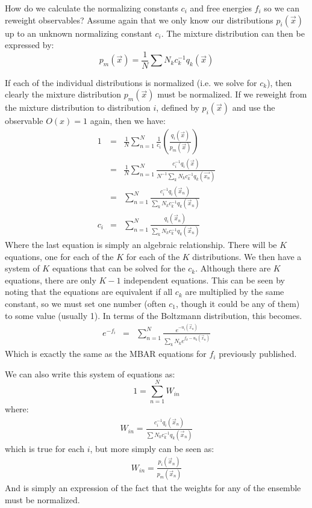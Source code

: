 \documentclass[aps,pre,twocolumn,superscriptaddress]{revtex4-1}
\begin{document}
How do we calculate the normalizing constants $c_i$ and free energies
$f_i$ so we can reweight observables? Assume again that we only know
our distributions $p_i(\vec{x})$ up to an unknown normalizing constant
$c_i$. The mixture distribution can then be expressed by:
\[ p_m(\vec{x}) = \frac{1}{N}\sum N_k c_k^{-1} q_k(\vec{x}) \]

If each of the individual distributions is normalized (i.e. we solve
for $c_k$), then clearly the mixture distribution $p_m(\vec{x})$ must
be normalized.  If we reweight from the mixture distribution to
distribution $i$, defined by $p_i(\vec{x})$ and use the observable
$O(x) = 1$ again, then we have:
\begin{eqnarray} 
  1  &=& \frac{1}{N} \sum_{n=1}^{N}\frac{1}{c_i} \left(\frac{q_i(\vec{x})}{p_m(\vec{x})}\right) \nonumber \\
     &=& \frac{1}{N} \sum_{n=1}^N\frac{c_i^{-1} q_i(\vec{x})}{N^{-1}\sum_k N_k c_k^{-1} q_k(\vec{x_n})} \nonumber \\
     &=& \sum_{n=1}^N \frac{c_i^{-1} q_i(\vec{x}_n)}{\sum_k N_k c_k^{-1} q_k(\vec{x}_n)} \nonumber\\
c_i  &=& \sum_{n=1}^N \frac{q_i(\vec{x}_n)}{\sum_k N_k c_k^{-1} q_k(\vec{x}_n)}
\end{eqnarray}
Where the last equation is simply an algebraic relationship.  There
will be $K$ equations, one for each of the $K$ for each of the $K$
distributions.  We then have a system of $K$ equations that can be
solved for the $c_k$.  Although there are $K$ equations, there are
only $K-1$ independent equations. This can be seen by noting that the
equations are equivalent if all $c_k$ are multiplied by the same
constant, so we must set one number (often $c_1$, though it could be
any of them) to some value (usually 1). In terms of the Boltzmann
distribution, this becomes.
\begin{eqnarray*}
e^{-f_i}  &=& \sum_{n=1}^N \frac{e^{-u_i(\vec{x}_n)}}{\sum_k N_k e^{f_k - u_k(\vec{x}_n)}}
\end{eqnarray*}
Which is exactly the same as the MBAR equations for $f_i$ previously
published.

We can also write this system of equations as:
\begin{equation*}
1 = \sum_{n=1}^N W_{in}
\end{equation*} 
where: 
\begin{eqnarray*}
W_{in} = \frac{c_i^{-1} q_i(\vec{x}_n)}{\sum N_k c_k^{-1} q_k(\vec{x}_n)} 
\end{eqnarray*}
which is true for each $i$, but more simply can be seen as:
\begin{eqnarray}
W_{in} = \frac{p_i(\vec{x}_n)}{p_m(\vec{x}_n)}
\end{eqnarray}
And is simply an expression of the fact that the weights for any of
the ensemble must be normalized.
\end{document}
